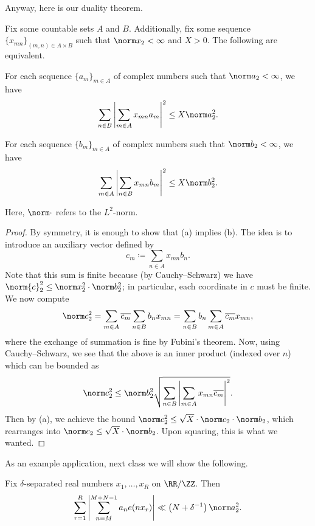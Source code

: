 \documentclass[../notes.tex]{subfiles}
\begin{document}
Anyway, here is our duality theorem.
\begin{theorem}
	Fix some countable sets $A$ and $B$. Additionally, fix some sequence $\{x_{mn}\}_{(m,n)\in A\times B}$ such that $\norm x_2<\infty$ and $X>0$. The following are equivalent.
	\begin{listalph}
		\item For each sequence $\{a_m\}_{m\in A}$ of complex numbers such that $\norm a_2<\infty$, we have
		\[\sum_{n\in B}\left|\sum_{m\in A}x_{mn}a_m\right|^2\le X\norm a_2^2.\]
		\item For each sequence $\{b_m\}_{m\in A}$ of complex numbers such that $\norm b_2<\infty$, we have
		\[\sum_{m\in A}\left|\sum_{n\in B}x_{mn}b_m\right|^2\le X\norm b_2^2.\]
	\end{listalph}
	Here, $\norm\cdot$ refers to the $L^2$-norm.
\end{theorem}
\begin{proof}
	By symmetry, it is enough to show that (a) implies (b). The idea is to introduce an auxiliary vector defined by
	\[c_m\coloneqq\sum_{n\in A}x_{mn}b_n.\]
	Note that this sum is finite because (by Cauchy--Schwarz) we have $\norm{c}_2^2\le\norm x_2^2\cdot\norm b_2^2$; in particular, each coordinate in $c$ must be finite. We now compute
	\[\norm c_2^2=\sum_{m\in A}\overline{c_m}\sum_{n\in B}b_nx_{mn}=\sum_{n\in B}b_n\sum_{m\in A}\overline{c_m}x_{mn},\]
	where the exchange of summation is fine by Fubini's theorem. Now, using Cauchy--Schwarz, we see that the above is an inner product (indexed over $n$) which can be bounded as
	\[\norm c_2^2\le\norm b_2^2\sqrt{\sum_{n\in B}\left|\sum_{m\in A}x_{mn}\overline{c_m}\right|^2}.\]
	Then by (a), we achieve the bound $\norm c_2^2\le\sqrt X\cdot\norm c_2\cdot\norm b_2$, which rearranges into $\norm c_2\le\sqrt X\cdot\norm b_2$. Upon squaring, this is what we wanted.
\end{proof}
As an example application, next class we will show the following.
\begin{theorem}
	Fix $\delta$-separated real numbers $x_1,\ldots,x_R$ on $\RR/\ZZ$. Then
	\[\sum_{r=1}^R\left|\sum_{n=M}^{M+N-1}a_ne(nx_r)\right|\ll\left(N+\delta^{-1}\right)\norm a_2^2.\]
\end{theorem}
\end{document}
